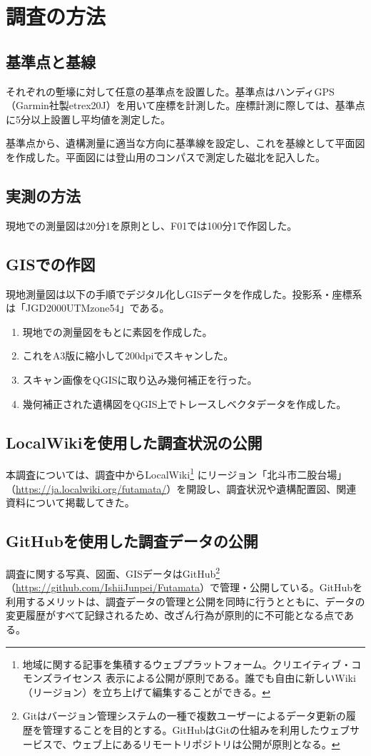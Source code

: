 \documentclass[14Q]{jsarticle}
\begin{document}
\section{調査の方法}
\subsection{基準点と基線}
それぞれの塹壕に対して任意の基準点を設置した。基準点はハンディGPS（Garmin社製etrex20J）を用いて座標を計測した。座標計測に際しては、基準点に5分以上設置し平均値を測定した。

基準点から、遺構測量に適当な方向に基準線を設定し、これを基線として平面図を作成した。平面図には登山用のコンパスで測定した磁北を記入した。

\subsection{実測の方法}
現地での測量図は20分1を原則とし、F01では100分1で作図した。

\subsection{GISでの作図}
現地測量図は以下の手順でデジタル化しGISデータを作成した。投影系・座標系は「JGD2000UTMzone54」である。
\begin{enumerate}
\item 現地での測量図をもとに素図を作成した。
\item これをA3版に縮小して200dpiでスキャンした。
\item スキャン画像をQGISに取り込み幾何補正を行った。
\item 幾何補正された遺構図をQGIS上でトレースしベクタデータを作成した。
\end{enumerate}

\subsection{LocalWikiを使用した調査状況の公開}
本調査については、調査中からLocalWiki\footnote{
地域に関する記事を集積するウェブプラットフォーム。クリエイティブ・コモンズライセンス 表示による公開が原則である。誰でも自由に新しいWiki（リージョン）を立ち上げて編集することができる。
}
にリージョン「北斗市二股台場」（\url{https://ja.localwiki.org/futamata/}）を開設し、調査状況や遺構配置図、関連資料について掲載してきた。

\subsection{GitHubを使用した調査データの公開}
調査に関する写真、図面、GISデータはGitHub\footnote{
Gitはバージョン管理システムの一種で複数ユーザーによるデータ更新の履歴を管理することを目的とする。GitHubはGitの仕組みを利用したウェブサービスで、ウェブ上にあるリモートリポジトリは公開が原則となる。
}
（\url{https://github.com/IshiiJunpei/Futamata}）で管理・公開している。GitHubを利用するメリットは、調査データの管理と公開を同時に行うとともに、データの変更履歴がすべて記録されるため、改ざん行為が原則的に不可能となる点である。
\end{document}
